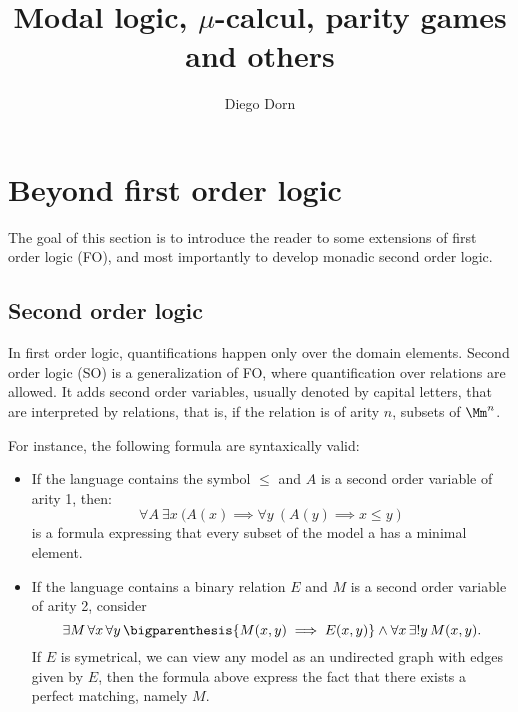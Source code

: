 

\title{Modal logic, $\mu$-calcul, parity games and others}
\author{Diego Dorn}

\newcommand{\infiniteWords}{\infseq{(\IB^n)}}
\newcommand{\Sing}{\mathrm{Sing}}
\newcommand{\Succ}{\mathrm{Succ}}
\newcommand{\spacedAutomata}[1]{\begin{center}
\begin{tikzpicture}[automata, node distance=90pt]
#1
\end{tikzpicture}
\end{center}}



\maketitle

\section{Beyond first order logic}

The goal of this section is to introduce the reader
to some extensions of first order logic (FO),
and most importantly to develop monadic second order logic.

\subsection{Second order logic}

In first order logic, quantifications happen only over the
domain elements.
Second order logic (SO) is a generalization of FO,
where quantification over relations are allowed.
It adds second order variables, usually denoted by capital
letters, that are interpreted by relations, that is,
if the relation is of arity $n$, subsets of $\Mm^n$.

For instance, the following formula are syntaxically valid:
\begin{itemize}
    \item If the language contains the symbol $\leq$
        and $A$ is a second order variable of arity 1, then:
    \[
        \forall A ~ \exists x ~
            (A(x) \implies \forall y ~
                (A(y) \implies x \leq y)
    \]
        is a formula expressing that every subset of the model
        a has a minimal element.
    \item If the language contains a binary relation $E$
        and $M$ is a second order variable of arity 2,
        consider
        \[
            \exists M\, \forall x\, \forall y \,
            \bigparenthesis{M(x, y) \implies E(x, y)}
            \wedge \forall x \, \exists! y \, M(x, y).
        \]
        If $E$ is symetrical, we can view any model as an
        undirected graph with edges given by $E$, then
        the formula above express the fact that
        there exists a perfect matching, namely $M$.
\end{itemize}

